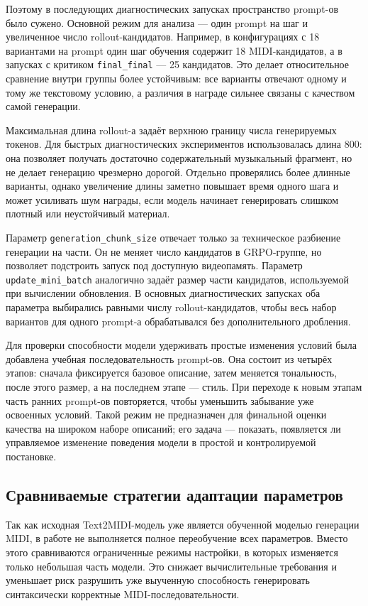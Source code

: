 \documentclass[a4paper,12pt]{extarticle}
\begin{document}
Поэтому в последующих диагностических запусках пространство prompt-ов было
сужено. Основной режим для анализа --- один prompt на шаг и увеличенное число
rollout-кандидатов. Например, в конфигурациях с 18 вариантами на prompt один
шаг обучения содержит 18 MIDI-кандидатов, а в запусках с критиком
\texttt{final\_final} --- 25 кандидатов. Это делает относительное сравнение
внутри группы более устойчивым: все варианты отвечают одному и тому же
текстовому условию, а различия в награде сильнее связаны с качеством самой
генерации.

Максимальная длина rollout-а задаёт верхнюю границу числа генерируемых
токенов. Для быстрых диагностических экспериментов использовалась длина 800:
она позволяет получать достаточно содержательный музыкальный фрагмент, но
не делает генерацию чрезмерно дорогой. Отдельно проверялись более длинные
варианты, однако увеличение длины заметно повышает время одного шага и может
усиливать шум награды, если модель начинает генерировать слишком плотный или
неустойчивый материал.

Параметр \texttt{generation\_chunk\_size} отвечает только за техническое
разбиение генерации на части. Он не меняет число кандидатов в GRPO-группе, но
позволяет подстроить запуск под доступную видеопамять. Параметр
\texttt{update\_mini\_batch} аналогично задаёт размер части кандидатов,
используемой при вычислении обновления. В основных диагностических запусках
оба параметра выбирались равными числу rollout-кандидатов, чтобы весь набор
вариантов для одного prompt-а обрабатывался без дополнительного дробления.

Для проверки способности модели удерживать простые изменения условий была
добавлена учебная последовательность prompt-ов. Она состоит из четырёх
этапов: сначала фиксируется базовое описание, затем меняется тональность,
после этого размер, а на последнем этапе --- стиль. При переходе к новым
этапам часть ранних prompt-ов повторяется, чтобы уменьшить забывание уже
освоенных условий. Такой режим не предназначен для финальной оценки качества
на широком наборе описаний; его задача --- показать, появляется ли управляемое
изменение поведения модели в простой и контролируемой постановке.

\subsection{Сравниваемые стратегии адаптации параметров}

Так как исходная Text2MIDI-модель уже является обученной моделью генерации
MIDI, в работе не выполняется полное переобучение всех параметров. Вместо
этого сравниваются ограниченные режимы настройки, в которых изменяется только
небольшая часть модели. Это снижает вычислительные требования и уменьшает
риск разрушить уже выученную способность генерировать синтаксически корректные
MIDI-последовательности.
\end{document}
